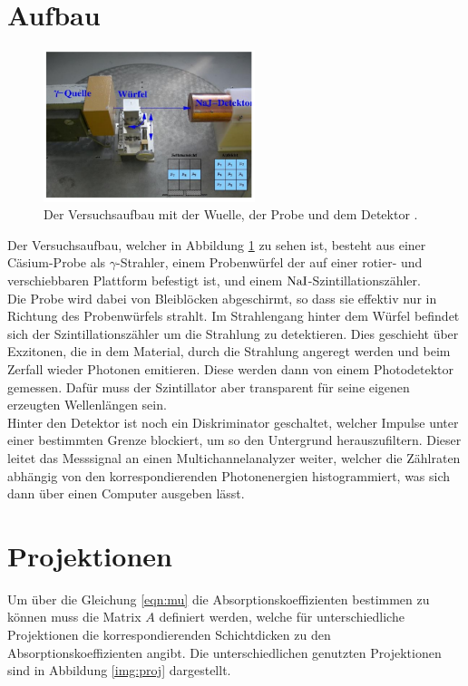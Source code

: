 \newpage
\section{Aufbau}

\begin{figure}[H]
    \centering
    \includegraphics[width=0.55\textwidth]{latex/images/aufbau.PNG}
    \caption{Der Versuchsaufbau mit der Wuelle, der Probe und dem Detektor \protect \cite{V14}.}
    \label{img:aufb}
\end{figure}

Der Versuchsaufbau, welcher in Abbildung \ref{img:aufb} zu sehen ist, besteht aus einer Cäsium-Probe als $\gamma$-Strahler, 
einem Probenwürfel der auf einer rotier- und verschiebbaren Plattform befestigt ist, und einem $\ce{NaI}$-Szintillationszähler.\\
Die Probe wird dabei von Bleiblöcken abgeschirmt, so dass sie effektiv nur in Richtung des Probenwürfels strahlt. 
Im Strahlengang hinter dem Würfel befindet sich der Szintillationszähler um die Strahlung zu detektieren. 
Dies geschieht über Exzitonen, die in dem Material, durch die Strahlung angeregt werden und beim Zerfall wieder Photonen emitieren. 
Diese werden dann von einem Photodetektor gemessen. Dafür muss der Szintillator aber transparent für seine eigenen erzeugten Wellenlängen sein.\\
Hinter den Detektor ist noch ein Diskriminator geschaltet, welcher Impulse unter einer bestimmten Grenze blockiert, um so den Untergrund herauszufiltern.
Dieser leitet das Messsignal an einen Multichannelanalyzer weiter, welcher die Zählraten abhängig von den korrespondierenden Photonenergien histogrammiert, 
was sich dann über einen Computer ausgeben lässt.

\section{Projektionen}
\label{sec:proj}

\noindent
Um über die Gleichung \ref{eqn:mu} die Absorptionskoeffizienten bestimmen zu können muss die Matrix $A$ definiert werden, 
welche für unterschiedliche  Projektionen die korrespondierenden Schichtdicken zu den Absorptionskoeffizienten angibt. 
Die unterschiedlichen genutzten Projektionen sind in Abbildung \ref{img:proj} dargestellt.

